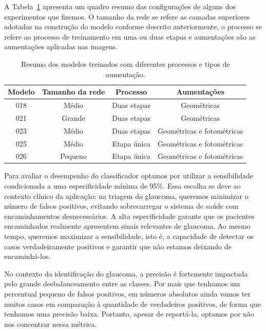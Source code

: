 \documentclass[12pt]{article}
\begin{document}
A Tabela~\ref{tab:modelos_class_binaria} apresenta um quadro resumo das configurações de alguns dos experimentos que fizemos. O tamanho da rede se refere as camadas superiores adotadas na construção do modelo conforme descrito anteriormente, o processo se refere ao processo de treinamento em uma ou duas etapas e aumentações são as aumentações aplicadas nas imagens.

\begin{table}[h]
\centering
\begin{tabular}{cccc}
\toprule
\textbf{Modelo} & \textbf{Tamanho da rede} & \textbf{Processo} & \textbf{Aumentações} \\ 
\midrule
018 & Médio   & Duas etapas  & Geométricas \\ 
021 & Grande  & Duas etapas  & Geométricas \\ 
023 & Médio   & Duas etapas  & Geométricas e fotométricas \\ 
025 & Médio   & Etapa única  & Geométricas e fotométricas \\ 
026 & Pequeno & Etapa única  & Geométricas e fotométricas \\ 
\bottomrule
\end{tabular}
\caption{Resumo dos modelos treinados com diferentes processos e tipos de aumentação.}
\label{tab:modelos_class_binaria}
\end{table}

Para avaliar o desempenho do classificador optamos por utilizar a sensibilidade condicionada a uma especificidade mínima de 95\%. Essa escolha se deve ao contexto clínico da aplicação: na triagem do glaucoma, queremos minimizar o número de falsos positivos, evitando sobrecarregar o sistema de saúde com encaminhamentos desnecessários. A alta especificidade garante que os pacientes encaminhados realmente apresentem sinais relevantes de glaucoma. Ao mesmo tempo, queremos maximizar a sensibilidade, isto é, a capacidade de detectar os casos verdadeiramente positivos e garantir que não estamos deixando de encaminhá-los.

No contexto da identificação do glaucoma, a precisão é fortemente impactada pelo grande desbalanceamento entre as classes. Por mais que tenhamos um percentual pequeno de falsos positivos, em números absolutos ainda vamos ter muitos casos em comparação à quantidade de verdadeiros positivos, de forma que tenhamos uma precisão baixa. Portanto, apesar de reportá-la, optamos por não nos concentrar nessa métrica.
\end{document}
